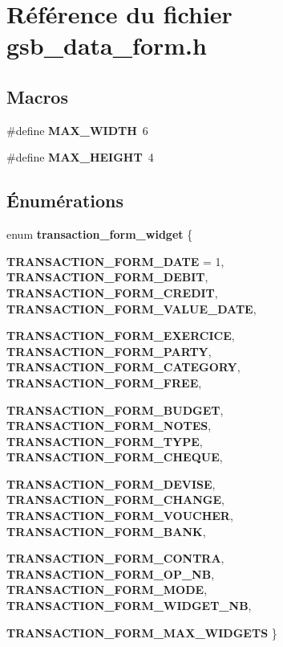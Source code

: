 \section{Référence du fichier gsb\_\-data\_\-form.h}
\label{gsb__data__form_8h}
\subsection*{Macros}
\begin{DoxyCompactItemize}
\item 
\#define {\bf MAX\_\-WIDTH}~6
\item 
\#define {\bf MAX\_\-HEIGHT}~4
\end{DoxyCompactItemize}
\subsection*{Énumérations}
\begin{DoxyCompactItemize}
\item 
enum {\bf transaction\_\-form\_\-widget} \{ \par
{\bf TRANSACTION\_\-FORM\_\-DATE} =  1, 
{\bf TRANSACTION\_\-FORM\_\-DEBIT}, 
{\bf TRANSACTION\_\-FORM\_\-CREDIT}, 
{\bf TRANSACTION\_\-FORM\_\-VALUE\_\-DATE}, 
\par
{\bf TRANSACTION\_\-FORM\_\-EXERCICE}, 
{\bf TRANSACTION\_\-FORM\_\-PARTY}, 
{\bf TRANSACTION\_\-FORM\_\-CATEGORY}, 
{\bf TRANSACTION\_\-FORM\_\-FREE}, 
\par
{\bf TRANSACTION\_\-FORM\_\-BUDGET}, 
{\bf TRANSACTION\_\-FORM\_\-NOTES}, 
{\bf TRANSACTION\_\-FORM\_\-TYPE}, 
{\bf TRANSACTION\_\-FORM\_\-CHEQUE}, 
\par
{\bf TRANSACTION\_\-FORM\_\-DEVISE}, 
{\bf TRANSACTION\_\-FORM\_\-CHANGE}, 
{\bf TRANSACTION\_\-FORM\_\-VOUCHER}, 
{\bf TRANSACTION\_\-FORM\_\-BANK}, 
\par
{\bf TRANSACTION\_\-FORM\_\-CONTRA}, 
{\bf TRANSACTION\_\-FORM\_\-OP\_\-NB}, 
{\bf TRANSACTION\_\-FORM\_\-MODE}, 
{\bf TRANSACTION\_\-FORM\_\-WIDGET\_\-NB}, 
\par
{\bf TRANSACTION\_\-FORM\_\-MAX\_\-WIDGETS}
 \}
\end{DoxyCompactItemize}

